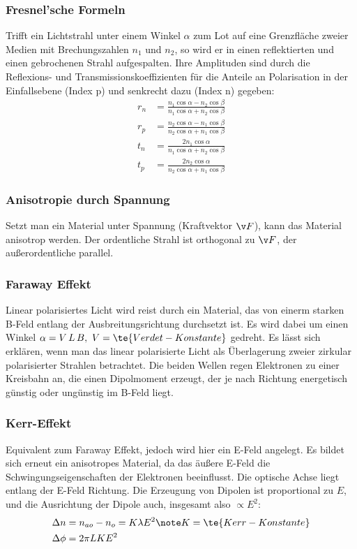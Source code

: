\documentclass[twocolumn, unnumberedsubsub]{summery_5.0} %
\begin{document}
\subsubsection{Fresnel'sche Formeln}
Trifft ein Lichtstrahl unter einem Winkel \(\alpha\) zum Lot auf eine Grenzfläche 
zweier Medien mit Brechungszahlen $n_1$ und $n_2$, so wird er in
einen reflektierten und einen gebrochenen Strahl aufgespalten. Ihre
Amplituden sind durch die Reflexions- und Transmissionskoeffizienten 
für die Anteile an Polarisation in der Einfallsebene (Index p) und
senkrecht dazu (Index n) gegeben:
\begin{align*}
    r_n &= \frac{n_1\cos\alpha - n_2\cos\beta}{n_1\cos\alpha + n_2\cos\beta}\\
    r_p &= \frac{n_2\cos\alpha - n_1\cos\beta}{n_2\cos\alpha + n_1\cos\beta}\\
    t_n &= \frac{2 n_1 \cos\alpha}{n_1\cos\alpha + n_2\cos\beta}\\
    t_p &= \frac{2 n_2 \cos\alpha}{n_2\cos\alpha + n_1\cos\beta}
\end{align*}

\subsubsection{Anisotropie durch Spannung}
Setzt man ein Material unter Spannung (Kraftvektor \(\v F\)), kann das Material 
anisotrop werden. Der ordentliche Strahl ist orthogonal zu \(\v F\), der
außerordentliche parallel.

\subsubsection{Faraway Effekt}
Linear polarisiertes Licht wird reist durch ein Material, das von einerm starken 
B-Feld entlang der Ausbreitungsrichtung durchsetzt ist. Es wird dabei 
um einen Winkel \(\alpha = V\, L \, B, \ V=\te{Verdet-Konstante}\) gedreht. Es lässt sich erklären, wenn man das linear polarisierte Licht als 
Überlagerung zweier zirkular polarisierter Strahlen betrachtet. 
Die beiden Wellen regen Elektronen zu einer Kreisbahn an, die einen Dipolmoment erzeugt,
der je nach Richtung energetisch günstig oder ungünstig im B-Feld liegt.

\subsubsection{Kerr-Effekt}
Equivalent zum Faraway Effekt, jedoch wird hier ein E-Feld angelegt. Es bildet sich erneut
ein anisotropes Material, da das äußere E-Feld die Schwingungseigenschaften der Elektronen 
beeinflusst. Die optische Achse liegt entlang der E-Feld Richtung.
Die Erzeugung von Dipolen ist proportional zu \(E\), und die Ausrichtung der 
Dipole auch, insgesamt also \(\propto E^2\):
\begin{align*}
    \Delta n &= n_{ao} - n_o = K \lambda E^2\note K=\te{Kerr-Konstante}\\
    \Delta \phi &= 2\pi L K E^2
\end{align*}
\end{document}
